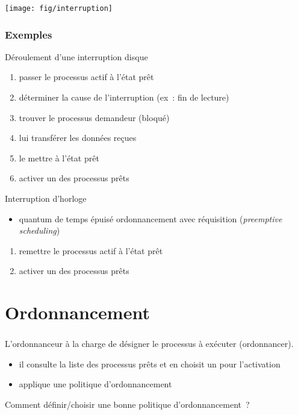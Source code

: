 \begin{frame}
\frametitle{\insertsubsection}
\begin{minipage}[t]{\linewidth}
  \center
  \texttt{[image: fig/interruption]}
\end{minipage}
\end{frame}

\begin{frame}
\frametitle{Exemples}
Déroulement d'une interruption disque
\begin{enumerate}
  \item passer le processus actif à l'\alert{état prêt}
  \item déterminer la cause de l'interruption (ex~: fin de lecture)
  \item trouver le processus demandeur (bloqué)
  \item lui transférer les données reçues
  \item \alert{le mettre à l'état prêt}
  \item \alert{activer un des processus prêts}
\end{enumerate}
\vspace{0.5cm}
Interruption d'horloge
\begin{itemize}
\item quantum de temps épuisé  ordonnancement avec réquisition
(\emph{preemptive scheduling})
\end{itemize}
\begin{enumerate}
  \item remettre le processus actif à l'\alert{état prêt}
  \item \alert{activer un des processus prêts}
\end{enumerate}
\end{frame}

\section{Ordonnancement}
\begin{frame}
\frametitle{\insertsection}
L'ordonnanceur à la charge de désigner le processus à exécuter (ordonnancer). 
\begin{itemize}
\item il consulte la liste des processus \alert{prêts} et en choisit un pour
  l'activation 
\end{itemize}

\begin{itemize}
\item[\ding{212}] applique une \alert{politique d'ordonnancement}
\end{itemize}
\vspace{0.5cm}

Comment définir/choisir une \alert{bonne politique} d'ordonnancement~?
\end{frame}

